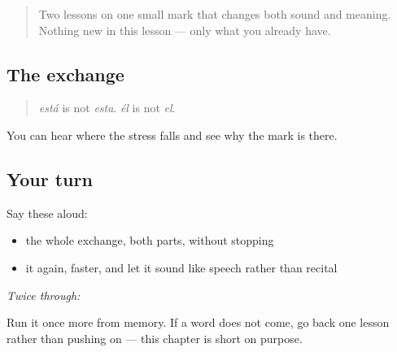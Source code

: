 \label{lesson:ES-W01-repaso-acento}



\begin{quote}
Two lessons on one small mark that changes both sound and meaning. Nothing new in this lesson — only what you already have.
\end{quote}

\subsection*{The exchange}
\begin{quote}
\emph{está} is not \emph{esta}. \emph{él} is not \emph{el}.
\end{quote}

\begin{grammarlens}[title={What you've built}]
You can hear where the stress falls and see why the mark is there.
\end{grammarlens}

\subsection*{Your turn}
Say these aloud:

\begin{itemize}
\raggedright
  \item the whole exchange, both parts, without stopping
  \item it again, faster, and let it sound like speech rather than recital
\end{itemize}

\emph{Twice through:}

\begin{tcolorbox}[breakable,colback=teal!4,colframe=teal!35!black,title={Before you move on}]
Run it once more from memory. If a word does not come, go back one lesson rather than pushing on — this chapter is short on purpose.
\end{tcolorbox}
